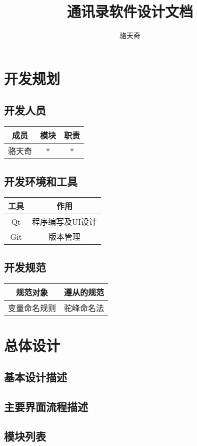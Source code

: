 \documentclass[a4paper,12pt]{report}
\title{通讯录软件设计文档}
\author{骆天奇}
\date{}
\begin{document}
	\maketitle
	\tableofcontents
	
	\chapter{开发规划}
		\section{开发人员}
			\begin{tabular}{|c|c|c|}
				\hline
				成员 & 模块 & 职责 \\
				\hline
				骆天奇 & * & * \\
				\hline
			\end{tabular}
		\section{开发环境和工具}
			\begin{tabular}{|c|c|}
				\hline
				工具 & 作用 \\
				\hline
				Qt & 程序编写及UI设计 \\
				\hline
				Git & 版本管理 \\
				\hline
			\end{tabular}
		\section{开发规范}
			\begin{tabular}{|c|c|}
				\hline
				规范对象 & 遵从的规范 \\
				\hline 
				变量命名规则 & 驼峰命名法 \\
				\hline
				
			\end{tabular}
	\chapter{总体设计}
		\section{基本设计描述}
		\section{主要界面流程描述}
		\section{模块列表}
\end{document}

